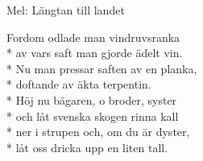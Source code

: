 \begin{SongText}[Tallen]
    \begin{SongInfo}
        Mel: Längtan till landet
    \end{SongInfo}
    \begin{SongVerse}
        Fordom odlade man vindruvsranka\\*%
        av vars saft man gjorde ädelt vin.\\*%
        Nu man pressar saften av en planka,\\*%
        doftande av äkta terpentin.\\*%
        Höj nu bägaren, o broder, syster\\*%
        och låt svenska skogen rinna kall\\*%
        ner i strupen och, om du är dyster,\\*%
        låt oss dricka upp en liten tall.
    \end{SongVerse}
\end{SongText}
